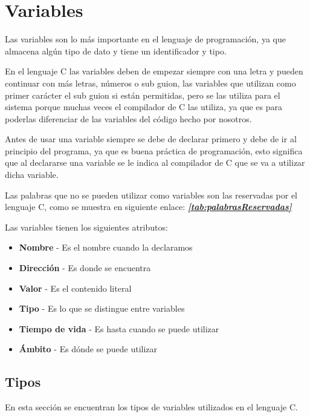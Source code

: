 \chapter[Variables]{Variables}
	\raggedright
	Las variables son lo más importante en el lenguaje de programación, ya que almacena algún tipo de dato y tiene un identificador y tipo. 
	
	\vspace{1em}
	En el lenguaje C las variables deben de empezar siempre con una letra y pueden continuar con más letras, números o sub guion, las variables que utilizan como primer carácter el sub guion si están permitidas, pero se las utiliza para el sistema porque muchas veces el compilador de C las utiliza, ya que es para poderlas diferenciar de las variables del código hecho por nosotros.
	
	\vspace{1em}
	Antes de usar una variable siempre se debe de declarar primero y debe de ir al principio del programa, ya que es buena práctica de programación, esto significa que al declararse una variable se le indica al compilador de C que se va a utilizar dicha variable.
	
	\vspace{1em}
	Las palabras que no se pueden utilizar como variables son las reservadas por el lenguaje C, como se muestra en siguiente enlace: \textbf{\textit{\autoref{tab:palabrasReservadas}}}
	
	\vspace{1em}
	Las variables tienen los siguientes atributos:
	\vspace{1em}
	\begin{itemize}
		\item {\textbf{Nombre}} - Es el nombre cuando la declaramos
		\item {\textbf{Dirección}} - Es donde se encuentra
		\item {\textbf{Valor}} - Es el contenido literal
		\item {\textbf{Tipo}} - Es lo que se distingue entre variables
		\item {\textbf{Tiempo de vida}} - Es hasta cuando se puede utilizar
		\item {\textbf{Ámbito}} - Es dónde se puede utilizar
	\end{itemize}
	
\section [Tipos]{Tipos}
	En esta sección se encuentran los tipos de variables utilizados en el lenguaje C.
	
